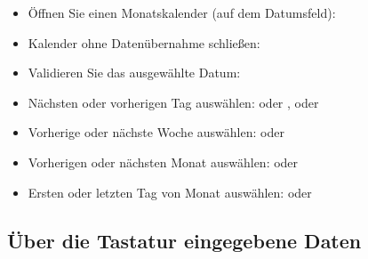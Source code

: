 \begin{itemize}
	\item Öffnen Sie einen Monatskalender (auf dem Datumsfeld): 
	\item Kalender ohne Datenübernahme schließen: 
	\item Validieren Sie das ausgewählte Datum: 
	\item Nächsten oder vorherigen Tag auswählen: \keys{{+}} oder \keys{{-}}, \keys{\arrowkeyright} oder \keys{\arrowkeyleft}
	\item Vorherige oder nächste Woche auswählen: \keys{\arrowkeyup} oder \keys{\arrowkeydown}
	\item Vorherigen oder nächsten Monat auswählen:  oder 
	\item Ersten oder letzten Tag von Monat auswählen:  oder 
\end{itemize}

\subsection{Über die Tastatur eingegebene Daten}

